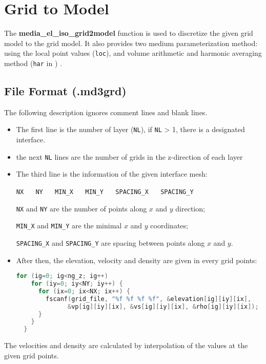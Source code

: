 \section{Grid to Model} \label{media-grid2model}
The \textbf{media\_el\_iso\_grid2model} function is used to discretize the given grid model to the grid model. It also provides two medium parameterization method: using the local point values (\texttt{loc}), and volume arithmetic and harmonic averaging method (\texttt{har} in ) \citep{moczo_3d_2002,moczo_finite-difference_2014}.

\subsection{File Format (.md3grd)}
The following description ignores comment lines and blank lines.
\begin{itemize}
 \item The first line is the number of layer (\texttt{NL}), if \texttt{NL} > 1, there is a designated interface.
 \item the next \texttt{NL} lines are the number of grids in the z-direction of each layer 
 \item {The third line is the information of the given interface mesh:
  
  \texttt{NX} ~~ \texttt{NY} ~~ \texttt{MIN\_X} ~~ \texttt{MIN\_Y} ~~ \texttt{SPACING\_X} ~~ \texttt{SPACING\_Y}

  \texttt{NX} and \texttt{NY} are the number of points along $x$ and $y$ direction;

  \texttt{MIN\_X} and \texttt{MIN\_Y} are the minimal $x$ and $y$ coordinates;

  \texttt{SPACING\_X} and \texttt{SPACING\_Y} are spacing between points along $x$ and $y$.
 }
 \item {
  After then, the elevation, velocity and density are given in every grid points:
  \begin{lstlisting}[language = C]
  for (ig=0; ig<ng_z; ig++)
    for (iy=0; iy<NY; iy++) {
      for (ix=0; ix<NX; ix++) { 
        fscanf(grid_file, "%f %f %f %f", &elevation[ig][iy][ix], 
              &vp[ig][iy][ix], &vs[ig][iy][ix], &rho[ig][iy][ix]);
      }
    }
  }
  \end{lstlisting}
 } 
\end{itemize}
The velocities and density are calculated by interpolation of the values at the given grid points.

